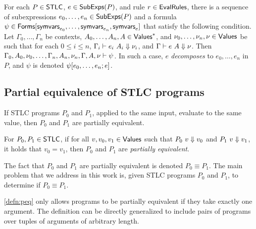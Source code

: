 For each $P \in \mathsf{STLC}$, $e \in \mathsf{SubExps}(P)$, and rule $r \in
\mathsf{EvalRules}$,
%
there is a sequence of subexpressions $e_0, \ldots, e_n \in
\mathsf{SubExps}(P)$ and a formula $\psi \in \mathsf{Forms}[  \mathsf{symvars}_{e_0}, \ldots,
  \mathsf{symvars}_{e_n}, \mathsf{symvars}_{e}  ]$ that satisfy the following condition.
%
Let $\Gamma_0, \ldots, \Gamma_n$ be contexts, $A_0, \ldots, A_n, A \in
\mathsf{Values}^{*}$, and $\nu_0, \ldots, \nu_n, \nu \in \mathsf{Values}$ be such that
for each $0 \leq i \leq n$, $\Gamma_i \vdash e_i\ A_i \Downarrow
\nu_i$, and $\Gamma \vdash e\ A \Downarrow \nu$.
%
Then $\Gamma_0, A_0, \nu_0, \ldots, \Gamma_n, A_n, \nu_n, \Gamma, A,
\nu \vdash \psi$.
%
In such a case, $e$ \emph{decomposes} to $e_0, \ldots, e_n$ in $P$,
and $\psi$ is denoted $\psi[  e_0, \ldots, e_n  ; e ]$.

\subsection{Partial equivalence of STLC programs}
\label{sec:peq}
%
If STLC programs $P_0$ and $P_1$, applied to the same input, evaluate
to the same value, then $P_0$ and $P_1$ are partially equivalent.
%
\begin{defn}
  \label{defn:peq}
  For $P_0, P_1 \in \mathsf{STLC}$, if for all $v, v_0, v_1 \in \mathsf{Values}$ such
  that $P_0\ v \Downarrow v_0$ and $P_1\ v \Downarrow v_1$, it holds that
  $v_0 = v_1$, then $P_0$ and $P_1$ are \emph{partially equivalent}.
\end{defn}
%
The fact that $P_0$ and $P_1$ are partially equivalent is denoted $P_0
\equiv P_1$.
%
The main problem that we address in this work is, given STLC programs
$P_0$ and $P_1$, to determine if $P_0 \equiv P_1$.

\autoref{defn:peq} only allows programs to be partially equivalent if
they take exactly one argument.
%
The definition can be directly generalized to include pairs of
programs over tuples of arguments of arbitrary length.


